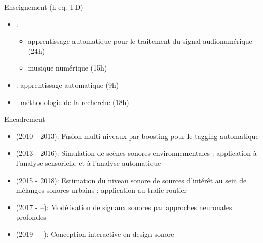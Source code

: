 \begin{frame}{Enseignement (h eq. TD)}
\begin{itemize}
  \item {} :
  \begin{itemize}
    \item apprentissage automatique pour le traitement du signal audionumérique (24h)
    \item musique numérique (15h)
  \end{itemize}
  \item {} : apprentissage automatique (9h)
  \item {} : méthodologie de la recherche (18h)
\end{itemize}
\end{frame}

\begin{frame}{Encadrement}
\begin{itemize}
  \item {} (2010 - 2013): \og Fusion multi-niveaux par boosting pour le tagging automatique \fg
  \item {} (2013 - 2016): \og Simulation de scènes sonores environnementales : application à l'analyse sensorielle et à l'analyse automatique \fg
  \item {} (2015 - 2018): \og Estimation du niveau sonore de sources d'intérêt au sein de mélanges sonores urbains : application au trafic routier \fg
  \item {} (2017 - --): \og Modélisation de signaux sonores par approches neuronales profondes \fg
  \item {} (2019 - --): \og Conception interactive en design sonore \fg
\end{itemize}
\end{frame}
